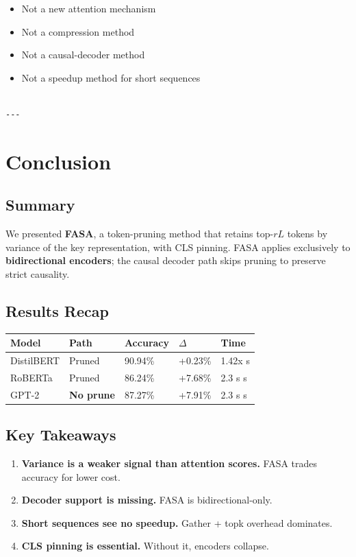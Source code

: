 \begin{itemize}
\item Not a new attention mechanism
\item Not a compression method
\item Not a causal-decoder method
\item Not a speedup method for short sequences
\end{itemize}
\begin{lstlisting}

---
\end{lstlisting}


\section{Conclusion}

\subsection{Summary}

We presented \textbf{FASA}, a token-pruning method that retains top-$rL$ tokens 
by variance of the key representation, with CLS pinning. FASA applies 
exclusively to \textbf{bidirectional encoders}; the causal decoder path skips 
pruning to preserve strict causality.

\subsection{Results Recap}

\begin{table}[H]
\centering
\small
\begin{tabular}{lllll}
\toprule
\textbf{Model} & \textbf{Path} & \textbf{Accuracy} & \textbf{$\Delta$} & \textbf{Time} \\
\midrule
DistilBERT & Pruned & 90.94\% & +0.23\% & 1.42x s \\
RoBERTa & Pruned & 86.24\% & +7.68\% & 2.3 s s \\
GPT-2 & \textbf{No prune} & 87.27\% & +7.91\% & 2.3 s s \\
\bottomrule
\end{tabular}
\end{table}

\subsection{Key Takeaways}

\begin{enumerate}
\item \textbf{Variance is a weaker signal than attention scores.} FASA trades
  accuracy for lower cost.
\item \textbf{Decoder support is missing.} FASA is bidirectional-only.
\item \textbf{Short sequences see no speedup.} Gather + topk overhead dominates.
\item \textbf{CLS pinning is essential.} Without it, encoders collapse.

\end{enumerate}
